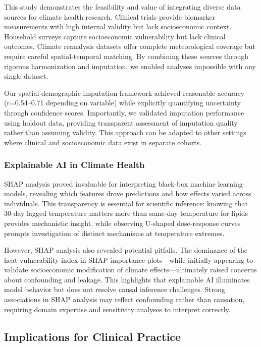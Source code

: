 This study demonstrates the feasibility and value of integrating diverse data sources for climate health research. Clinical trials provide biomarker measurements with high internal validity but lack socioeconomic context. Household surveys capture socioeconomic vulnerability but lack clinical outcomes. Climate reanalysis datasets offer complete meteorological coverage but require careful spatial-temporal matching. By combining these sources through rigorous harmonization and imputation, we enabled analyses impossible with any single dataset.

Our spatial-demographic imputation framework achieved reasonable accuracy (r=0.54--0.71 depending on variable) while explicitly quantifying uncertainty through confidence scores. Importantly, we validated imputation performance using holdout data, providing transparent assessment of imputation quality rather than assuming validity. This approach can be adapted to other settings where clinical and socioeconomic data exist in separate cohorts.

\subsubsection{Explainable AI in Climate Health}

SHAP analysis proved invaluable for interpreting black-box machine learning models, revealing which features drove predictions and how effects varied across individuals. This transparency is essential for scientific inference: knowing that 30-day lagged temperature matters more than same-day temperature for lipids provides mechanistic insight, while observing U-shaped dose-response curves prompts investigation of distinct mechanisms at temperature extremes.

However, SHAP analysis also revealed potential pitfalls. The dominance of the heat vulnerability index in SHAP importance plots---while initially appearing to validate socioeconomic modification of climate effects---ultimately raised concerns about confounding and leakage. This highlights that explainable AI illuminates model behavior but does not resolve causal inference challenges. Strong associations in SHAP analysis may reflect confounding rather than causation, requiring domain expertise and sensitivity analyses to interpret correctly.

\subsection{Implications for Clinical Practice}

